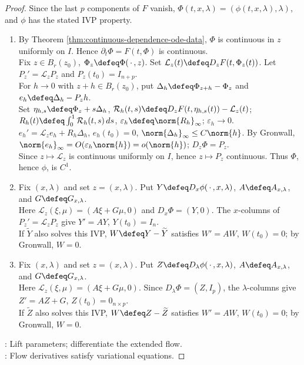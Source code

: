 \begin{theorem}
\begin{proof}
Since the last $p$ components of $F$ vanish, $\Phi(t,x,\lambda)=(\phi(t,x,\lambda),\lambda)$, and $\phi$ has the stated IVP property.
\begin{enumerate}[label=(\roman*)]
\setlength{\itemsep}{0pt}
\item By Theorem \ref{thm:continuous-dependence-ode-data}, $\Phi$ is continuous in $z$ uniformly on $I$. Hence $\partial_t\Phi=F(t,\Phi)$ is continuous.\\
Fix $z\in B_r(z_0)$, $\Phi_z\defeq\Phi(\,\cdot\,,z)$. Set $\mathcal L_z(t)\defeq D_zF(t,\Phi_z(t))$. Let $P_z'=\mathcal L_zP_z$ and $P_z(t_0)=I_{n+p}$.\\
For $h\to0$ with $z+h\in B_r(z_0)$, put $\Delta_h\defeq\Phi_{z+h}-\Phi_z$ and $e_h\defeq\Delta_h-P_zh$.\\
Set $\eta_{h,s}\defeq\Phi_z+s\Delta_h$, $\mathcal R_h(t,s)\defeq D_zF(t,\eta_{h,s}(t))-\mathcal L_z(t)$; $R_h(t)\defeq\int_0^1\mathcal R_h(t,s)\,ds$, $\varepsilon_h\defeq\norm{R_h}_\infty$; $\varepsilon_h\to0$.\\
$e_h'=\mathcal L_ze_h+R_h\Delta_h$, $e_h(t_0)=0$, $\norm{\Delta_h}_\infty\leq C\norm{h}$. By Gronwall, $\norm{e_h}_\infty=O(\varepsilon_h\norm{h})=o(\norm{h})$; $D_z\Phi=P_z$.\\
Since $z\mapsto\mathcal L_z$ is continuous uniformly on $I$, hence $z\mapsto P_z$ continuous. Thus $\Phi$, hence $\phi$, is $C^1$.
\item Fix $(x,\lambda)$ and set $z=(x,\lambda)$. Put $Y\defeq D_x\phi(\,\cdot\,,x,\lambda)$, $A\defeq A_{x,\lambda}$, and $G\defeq G_{x,\lambda}$.\\
Here $\mathcal L_z(\xi,\mu)=(A\xi+G\mu,0)$ and $D_x\Phi=(Y,0)$. The $x$-columns of $P_z'=\mathcal L_zP_z$ give $Y'=AY$, $Y(t_0)=I_n$.\\
If $\widetilde Y$ also solves this IVP, $W\defeq Y-\widetilde Y$ satisfies $W'=AW$, $W(t_0)=0$; by Gronwall, $W=0$.
\item Fix $(x,\lambda)$ and set $z=(x,\lambda)$. Put $Z\defeq D_\lambda\phi(\,\cdot\,,x,\lambda)$, $A\defeq A_{x,\lambda}$, and $G\defeq G_{x,\lambda}$.\\
Here $\mathcal L_z(\xi,\mu)=(A\xi+G\mu,0)$. Since $D_\lambda\Phi=(Z,I_p)$, the $\lambda$-columns give $Z'=AZ+G$, $Z(t_0)=0_{n\times p}$.\\
If $\widetilde Z$ also solves this IVP, $W\defeq Z-\widetilde Z$ satisfies $W'=AW$, $W(t_0)=0$; by Gronwall, $W=0$.
\end{enumerate}
: Lift parameters; differentiate the extended flow.\\
: Flow derivatives satisfy variational equations.
\end{proof}
\end{theorem}

